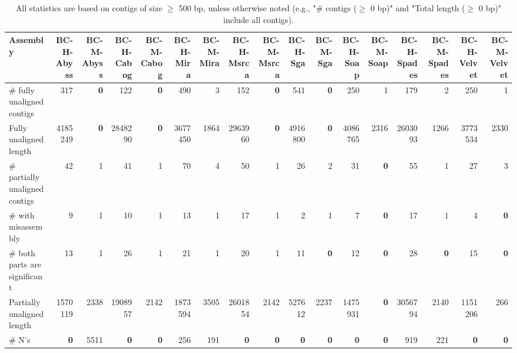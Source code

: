 \documentclass[12pt,a4paper]{article}
\begin{document}
\begin{table}[ht]
\begin{center}
\caption{All statistics are based on contigs of size $\geq$ 500 bp, unless otherwise noted (e.g., "\# contigs ($\geq$ 0 bp)" and "Total length ($\geq$ 0 bp)" include all contigs).}
\begin{tabular}{|l*{16}{|r}|}
\hline
Assembly & BC-H-Abyss & BC-M-Abyss & BC-H-Cabog & BC-M-Cabog & BC-H-Mira & BC-M-Mira & BC-H-Msrca & BC-M-Msrca & BC-H-Sga & BC-M-Sga & BC-H-Soap & BC-M-Soap & BC-H-Spades & BC-M-Spades & BC-H-Velvet & BC-M-Velvet \\ \hline
\# fully unaligned contigs & 317 & {\bf 0} & 122 & {\bf 0} & 490 & 3 & 152 & {\bf 0} & 541 & {\bf 0} & 250 & 1 & 179 & 2 & 250 & 1 \\ \hline
Fully unaligned length & 4185249 & {\bf 0} & 2848290 & {\bf 0} & 3677450 & 1864 & 2963960 & {\bf 0} & 4916800 & {\bf 0} & 4086765 & 2316 & 2603093 & 1266 & 3773534 & 2330 \\ \hline
\# partially unaligned contigs & 42 & 1 & 41 & 1 & 70 & 4 & 50 & 1 & 26 & 2 & 31 & {\bf 0} & 55 & 1 & 27 & 3 \\ \hline
\hspace{5mm}\# with misassembly & 9 & 1 & 10 & 1 & 13 & 1 & 17 & 1 & 2 & 1 & 7 & {\bf 0} & 17 & 1 & 4 & {\bf 0} \\ \hline
\hspace{5mm}\# both parts are significant & 13 & 1 & 26 & 1 & 21 & 1 & 20 & 1 & 11 & {\bf 0} & 12 & {\bf 0} & 28 & {\bf 0} & 15 & {\bf 0} \\ \hline
Partially unaligned length & 1570119 & 2338 & 1908957 & 2142 & 1873594 & 3505 & 2601854 & 2142 & 527612 & 2237 & 1475931 & {\bf 0} & 3056794 & 2140 & 1151206 & 266 \\ \hline
\# N's & {\bf 0} & 5511 & {\bf 0} & {\bf 0} & 256 & 191 & {\bf 0} & {\bf 0} & {\bf 0} & {\bf 0} & {\bf 0} & {\bf 0} & 919 & 221 & {\bf 0} & {\bf 0} \\ \hline
\end{tabular}
\end{center}
\end{table}
\end{document}
